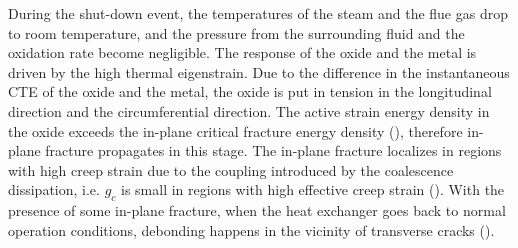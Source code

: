 





During the shut-down event, the temperatures of the steam and the flue gas drop to room temperature, and the pressure from the surrounding fluid and the oxidation rate become negligible. The response of the oxide and the metal is driven by the high thermal eigenstrain. Due to the difference in the instantaneous CTE of the oxide and the metal, the oxide is put in tension in the longitudinal direction and the circumferential direction. The active strain energy density in the oxide exceeds the in-plane critical fracture energy density (), therefore in-plane fracture propagates in this stage. The in-plane fracture localizes in regions with high creep strain due to the coupling introduced by the coalescence dissipation, i.e. $g_c$ is small in regions with high effective creep strain (). With the presence of some in-plane fracture, when the heat exchanger goes back to normal operation conditions, debonding happens in the vicinity of transverse cracks ().
